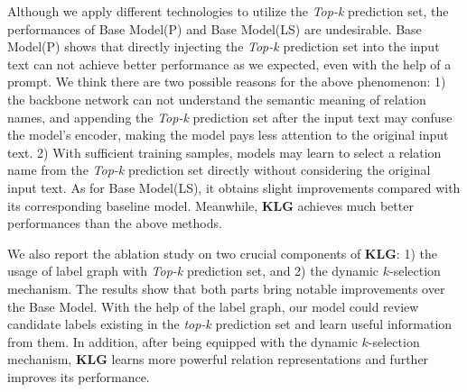 Although we apply different technologies to utilize the \textit{Top-k} prediction set, the performances of Base Model(P) and Base Model(LS) are undesirable. Base Model(P) shows that directly injecting the \textit{Top-k} prediction set into the input text can not achieve better performance as we expected, even with the help of a prompt. We think there are two possible reasons for the above phenomenon: 1) the backbone network can not understand the semantic meaning of relation names, and appending the \textit{Top-k} prediction set after the input text may confuse the model's encoder, making the model pays less attention to the original input text. 2) With sufficient training samples, models may learn to select a relation name from the \textit{Top-k} prediction set directly without considering the original input text. As for Base Model(LS), it obtains slight improvements compared with its corresponding baseline model. Meanwhile, \textbf{KLG} achieves much better performances than the above methods. 

We also report the ablation study on two crucial components of \textbf{KLG}: 1) the usage of label graph with \textit{Top-k} prediction set, and 2) the dynamic $k$-selection mechanism. The results show that both parts bring notable improvements over the Base Model. With the help of the label graph, our model could review candidate labels existing in the \textit{top-k} prediction set and learn useful information from them. In addition, after being equipped with the dynamic $k$-selection mechanism, \textbf{KLG} learns more powerful relation representations and further improves its performance.


